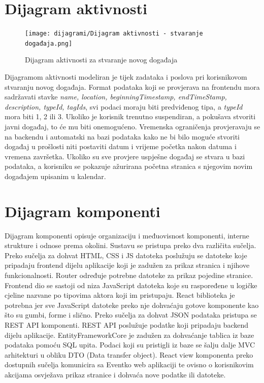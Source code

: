 				\eject 
		
			\section{Dijagram aktivnosti}
			
				\begin{figure}[H]
					\texttt{[image: dijagrami/Dijagram aktivnosti - stvaranje događaja.png]}
					\caption{Dijagram aktivnosti za stvaranje novog događaja}
				\end{figure}
			
				\indent Dijagramom aktivnosti modeliran je tijek zadataka i poslova pri korisnikovom stvaranju novog događaja. Format podataka koji se provjerava na frontendu mora sadržavati stavke \textit{name, location, beginningTimestamp, endTimeStamp, description, typeId, tagIds}, svi podaci moraju biti predviđenog tipa, a \textit{typeId} mora biti 1, 2 ili 3. Ukoliko je korisnik trenutno suspendiran, a pokušava stvoriti javni događaj, to će mu biti onemogućeno. Vremenska ograničenja provjeravaju se na backendu i automatski na bazi podataka kako ne bi bilo moguće stvoriti događaj u prošlosti niti postaviti datum i vrijeme početka nakon datuma i vremena završetka. Ukoliko su sve provjere uspješne događaj se stvara u bazi podataka, a korisniku se pokazuje ažurirana početna stranica s njegovim novim događajem upisanim u kalendar.
			
				\eject
				
			\section{Dijagram komponenti}
		
				\indent Dijagram komponenti opisuje organizaciju i međuovisnost komponenti, interne strukture i odnose prema okolini. Sustavu se pristupa preko dva različita sučelja. Preko sučelja za dohvat HTML, CSS i JS datoteka poslužuju se datoteke koje pripadaju frontend dijelu aplikacije koji je zadužen za prikaz stranica i njihove funkcionalnosti. Router određuje potrebne datoteke za prikaz pojedine stranice. Frontend dio se sastoji od niza JavaScript datoteka koje su raspoređene u logičke cjeline nazvane po tipovima aktora koji im pristupaju. React biblioteka je potrebna jer sve JavaScript datoteke preko nje dohvaćaju gotove komponente kao što su gumbi, forme i slično. Preko sučelja za dohvat JSON podataka pristupa se REST API komponenti. REST API poslužuje podatke koji pripadaju backend dijelu aplikacije. EntityFrameworkCore je zadužen za dohvaćanje tablica iz baze podataka pomoću SQL upita. Podaci koji su pristigli iz baze se šalju dalje MVC arhitekturi u obliku DTO (Data transfer object). Reactview komponenta preko dostupnih sučelja komunicira sa Eventko web aplikaciji te ovisno o korisnikovim akcijama osvježava prikaz stranice i dohvaća nove podatke ili datoteke.

